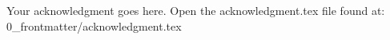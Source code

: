 

\begin{acknowledgements}      %

Your acknowledgment goes here. 
Open the acknowledgment.tex file found at: 0\_frontmatter/acknowledgment.tex

\end{acknowledgements}



